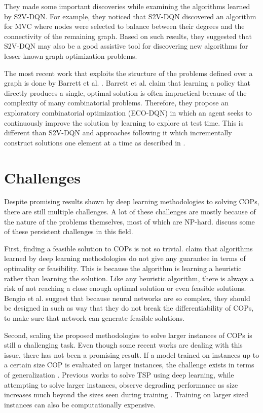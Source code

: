 \documentclass{article}
\begin{document}
They made some important discoveries while examining the algorithms learned by S2V-DQN. For example, they noticed that S2V-DQN discovered an algorithm for MVC where nodes were selected to balance between their degrees and the connectivity of the remaining graph. Based on such results, they suggested that S2V-DQN may also be a good assistive tool for discovering new algorithms for lesser-known graph optimization problems.    

The most recent work that exploits the structure of the problems defined over a graph is done by Barrett et al. \cite{barrett2019exploratory}. Barrett et al. claim that learning a policy that directly produces a single, optimal solution is often impractical because of the complexity of many combinatorial problems. Therefore, they propose an exploratory combinatorial optimization (ECO-DQN) in which an agent seeks to continuously improve the solution by learning to explore at test time. This is different than S2V-DQN and approaches following it which incrementally construct solutions one element at a time as described in \cite{khalil2017learning}.  

\section{Challenges}
Despite promising results shown by deep learning methodologies to solving COPs, there are still multiple challenges. A lot of these challenges are mostly because of the nature of the problems themselves, most of which are NP-hard. \cite{bengio2018machine} discuss some of these persistent challenges in this field.

First, finding a feasible solution to COPs is not so trivial. \cite{bengio2018machine} claim that algorithms learned by deep learning methodologies do not give any guarantee in terms of optimality or feasibility. This is because the algorithm is learning a heuristic rather than learning the solution. Like any heuristic algorithm, there is always a risk of not reaching a close enough optimal solution or even feasible solutions. Bengio et al. suggest that because neural networks are so complex, they should be designed in such as way that they do not break the differentiability of COPs, to make sure that network can generate feasible solutions.

Second, scaling the proposed methodologies to solve larger instances of COPs is still a challenging task. Even though some recent works are dealing with this issue, there has not been a promising result. If a model trained on instances up to a certain size COP is evaluated on larger instances, the challenge exists in terms of generalization \cite{bengio2018machine}. Previous works to solve TSP using deep learning, while attempting to solve larger instances, observe degrading performance as size increases much beyond the sizes seen during training \cite{vinyals2015pointer, bello2016neural, khalil2017learning}. Training on larger sized instances can also be computationally expensive.
\end{document}
